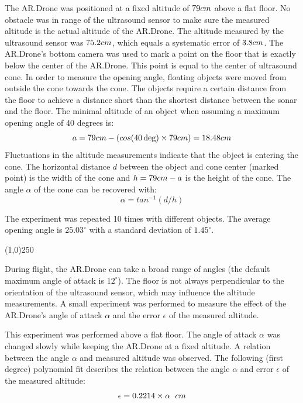 The AR.Drone was positioned at a fixed altitude of $79\small{cm}$ above a flat floor.
No obstacle was in range of the ultrasound sensor to make sure the measured altitude is the actual altitude of the AR.Drone.
The altitude measured by the ultrasound sensor was $75.2\small{cm}$, which equals a systematic error of $3.8\small{cm}$.
The AR.Drone's bottom camera was used to mark a point on the floor that is exactly below the center of the AR.Drone.
This point is equal to the center of ultrasound cone.
In order to measure the opening angle, floating objects were moved from outside the cone towards the cone.
The objects require a certain distance from the floor to achieve a distance short than the shortest distance between the sonar and the floor.
The minimal altitude of an object when assuming a maximum opening angle of 40 degrees is:
\begin{equation}
a = 79\small{cm} - (cos(40\deg) \times 79\small{cm}) = 18.48\small{cm}
\end{equation}
Fluctuations in the altitude measurements indicate that the object is entering the cone.
The horizontal distance $d$ between the object and cone center (marked point) is the width of the cone and $h = 79\small{cm} - a$ is the height of the cone.
The angle $\alpha$ of the cone can be recovered with:
\begin{equation}
\alpha = tan^{-1}(d / h)
\end{equation}

The experiment was repeated 10 times with different objects.
The average opening angle is $25.03^{\circ}$ with a standard deviation of $1.45^{\circ}$.
\normalsize
\normalcolor


\begin{center}
\line(1,0){250}
\end{center}
\color{mediumgray}
\small

During flight, the AR.Drone can take a broad range of angles (the default maximum angle of attack is $12^{\circ}$).
The floor is not always perpendicular to the orientation of the ultrasound sensor, which may influence the altitude measurements.
A small experiment was performed to measure the effect of the AR.Drone's angle of attack $\alpha$ and the error $\epsilon$ of the measured altitude.

This experiment was performed above a flat floor.
The angle of attack $\alpha$ was changed slowly while keeping the AR.Drone at a fixed altitude.
A relation between the angle $\alpha$ and measured altitude was observed.
The following (first degree) polynomial fit describes the relation between the angle $\alpha$ and error $\epsilon$ of the measured altitude:
\begin{equation}
\epsilon = 0.2214 \times \alpha \hspace{0.2cm} \small{cm}
\end{equation}
\normalsize
\normalcolor



